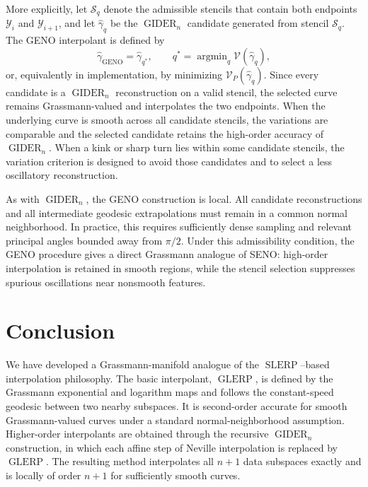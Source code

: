 \documentclass[a4paper,11pt]{article}
\DeclareMathOperator*{\argmin}{argmin}
\newcommand{\SLERP}{\operatorname{SLERP}}
\newcommand{\GLERP}{\operatorname{GLERP}}
\newcommand{\GIDER}{\operatorname{GIDER}}
\numberwithin{equation}{section}
\theoremstyle{plain}
\theoremstyle{definition}
\theoremstyle{remark}
\begin{document}
More explicitly, let \(\mathcal{S}_q\) denote the admissible stencils that contain both endpoints \(\mathcal{Y}_i\) and \(\mathcal{Y}_{i+1}\), and let \(\widehat\gamma_q\) be the \(\GIDER_n\) candidate generated from stencil \(\mathcal{S}_q\).  The GENO interpolant is defined by
\[
    \widehat\gamma_{\mathrm{GENO}}
    =
    \widehat\gamma_{q^\ast},
    \qquad
    q^\ast
    =
    \argmin_q \mathcal{V}(\widehat\gamma_q),
\]
or, equivalently in implementation, by minimizing \(\mathcal{V}_P(\widehat\gamma_q)\).  Since every candidate is a \(\GIDER_n\) reconstruction on a valid stencil, the selected curve remains Grassmann-valued and interpolates the two endpoints.  When the underlying curve is smooth across all candidate stencils, the variations are comparable and the selected candidate retains the high-order accuracy of \(\GIDER_n\).  When a kink or sharp turn lies within some candidate stencils, the variation criterion is designed to avoid those candidates and to select a less oscillatory reconstruction.

As with \(\GIDER_n\), the GENO construction is local.  All candidate reconstructions and all intermediate geodesic extrapolations must remain in a common normal neighborhood.  In practice, this requires sufficiently dense sampling and relevant principal angles bounded away from \(\pi/2\).  Under this admissibility condition, the GENO procedure gives a direct Grassmann analogue of SENO: high-order interpolation is retained in smooth regions, while the stencil selection suppresses spurious oscillations near nonsmooth features.


\section{Conclusion}
\label{sec:conclusion}

We have developed a Grassmann-manifold analogue of the \(\SLERP\)--based interpolation philosophy.  The basic interpolant, \(\GLERP\), is defined by the Grassmann exponential and logarithm maps and follows the constant-speed geodesic between two nearby subspaces.  It is second-order accurate for smooth Grassmann-valued curves under a standard normal-neighborhood assumption.  Higher-order interpolants are obtained through the recursive \(\GIDER_n\) construction, in which each affine step of Neville interpolation is replaced by \(\GLERP\).  The resulting method interpolates all \(n+1\) data subspaces exactly and is locally of order \(n+1\) for sufficiently smooth curves.
\end{document}
